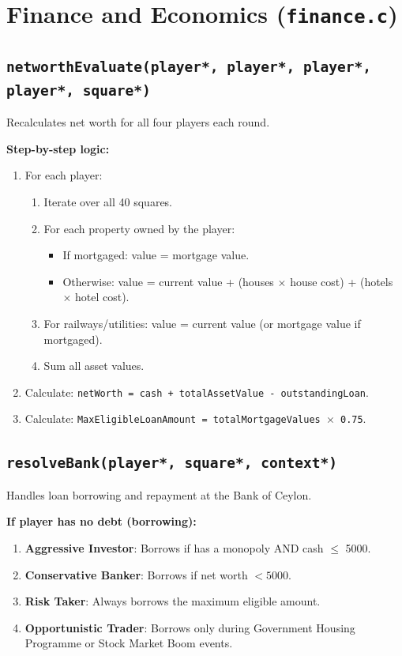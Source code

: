 \documentclass[12pt,a4paper]{article}
\begin{document}
\newpage

\section{Finance and Economics (\texttt{finance.c})}

\subsection{\texttt{networthEvaluate(player*, player*, player*, player*, square*)}}
Recalculates net worth for all four players each round.

\textbf{Step-by-step logic:}
\begin{enumerate}[noitemsep]
    \item For each player:
    \begin{enumerate}[noitemsep]
        \item Iterate over all 40 squares.
        \item For each property owned by the player:
        \begin{itemize}[noitemsep]
            \item If mortgaged: value = mortgage value.
            \item Otherwise: value = current value + (houses $\times$ house cost) + (hotels $\times$ hotel cost).
        \end{itemize}
        \item For railways/utilities: value = current value (or mortgage value if mortgaged).
        \item Sum all asset values.
    \end{enumerate}
    \item Calculate: \texttt{netWorth = cash + totalAssetValue - outstandingLoan}.
    \item Calculate: \texttt{MaxEligibleLoanAmount = totalMortgageValues $\times$ 0.75}.
\end{enumerate}

\subsection{\texttt{resolveBank(player*, square*, context*)}}
Handles loan borrowing and repayment at the Bank of Ceylon.

\textbf{If player has no debt (borrowing):}
\begin{enumerate}[noitemsep]
    \item \textbf{Aggressive Investor}: Borrows if has a monopoly AND cash $\leq$ 5000.
    \item \textbf{Conservative Banker}: Borrows if net worth $< 5000$.
    \item \textbf{Risk Taker}: Always borrows the maximum eligible amount.
    \item \textbf{Opportunistic Trader}: Borrows only during Government Housing Programme or Stock Market Boom events.
\end{enumerate}
\end{document}
